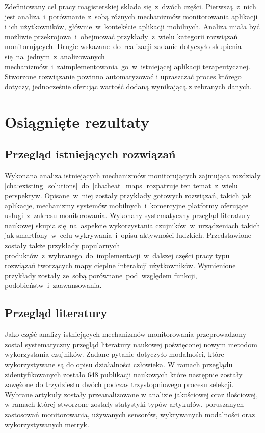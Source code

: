 Zdefiniowany cel pracy magisterskiej składa się~z~dwóch części. Pierwszą~z~nich jest analiza~i~porównanie~z~sobą różnych mechanizmów monitorowania aplikacji i ich użytkowników, głównie~w~kontekście aplikacji mobilnych. Analiza miała być możliwie przekrojowa~i~obejmować przykłady~z~wielu kategorii rozwiązań monitorujących. Drugie wskazane~do~realizacji zadanie dotyczyło skupienia się~na~jednym~z~analizowanych mechanizmów~i~zaimplementowania~go~w~istniejącej aplikacji terapeutycznej. Stworzone rozwiązanie powinno automatyzować i upraszczać proces którego dotyczy, jednocześnie oferując wartość dodaną wynikającą z zebranych danych.
	
\section{Osiągnięte rezultaty}

\subsection{Przegląd istniejących rozwiązań}
Wykonana analiza istniejących mechanizmów monitorujących zajmująca rozdziały \ref{cha:existing_solutions}~do~\ref{cha:heat_maps} rozpatruje ten temat~z~wielu perspektyw. Opisane~w~niej zostały przykłady gotowych rozwiązań, takich jak aplikacje, mechanizmy systemów mobilnych~i~komercyjne platformy oferujące usługi~z~zakresu monitorowania. Wykonany systematyczny przegląd literatury naukowej skupia się~na~aspekcie wykorzystania czujników~w~urządzeniach takich jak smartfony~w~celu wykrywania~i~opisu aktywności ludzkich. Przedstawione zostały także przykłady popularnych produktów~z~wybranego~do~implementacji~w~dalszej części pracy typu rozwiązań tworzących mapy cieplne interakcji użytkowników. Wymienione przykłady zostały ze~sobą porównane~pod~względem funkcji, podobieństw~i~zaawansowania.

\subsection{Przegląd literatury}
Jako część analizy istniejących mechanizmów monitorowania przeprowadzony został systematyczny przegląd literatury naukowej poświęconej nowym metodom wykorzystania czujników. Zadane pytanie dotyczyło modalności, które wykorzystywane są do opisu działalności człowieka. W ramach przeglądu zidentyfikowanych zostało 648 publikacji naukowych które następnie zostały zawężone do trzydziestu dwóch podczas trzystopniowego procesu selekcji. Wybrane artykuły zostały przeanalizowane w analizie jakościowej oraz ilościowej, w ramach której stworzone zostały statystyki typów artykułów, poruszanych zastosowań monitorowania, używanych sensorów, wykrywanych modalności oraz wykorzystywanych metryk.

